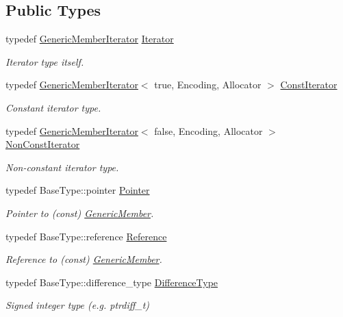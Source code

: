 \subsection*{Public Types}
\begin{DoxyCompactItemize}
\item 
typedef \hyperlink{classGenericMemberIterator}{Generic\+Member\+Iterator} \hyperlink{classGenericMemberIterator_ad1cf1ecf6210b47906c9f179c893a8b8}{Iterator}
\begin{DoxyCompactList}\small\item\em Iterator type itself. \end{DoxyCompactList}\item 
typedef \hyperlink{classGenericMemberIterator}{Generic\+Member\+Iterator}$<$ true, Encoding, Allocator $>$ \hyperlink{classGenericMemberIterator_ae5be27a73dce0be58ee2776db896d591}{Const\+Iterator}
\begin{DoxyCompactList}\small\item\em Constant iterator type. \end{DoxyCompactList}\item 
typedef \hyperlink{classGenericMemberIterator}{Generic\+Member\+Iterator}$<$ false, Encoding, Allocator $>$ \hyperlink{classGenericMemberIterator_abc26eb06f2962765b11dcd06ce84ac02}{Non\+Const\+Iterator}
\begin{DoxyCompactList}\small\item\em Non-\/constant iterator type. \end{DoxyCompactList}\item 
typedef Base\+Type\+::pointer \hyperlink{classGenericMemberIterator_ac69f141f1fde31c1f550f524a69c5de9}{Pointer}
\begin{DoxyCompactList}\small\item\em Pointer to (const) \hyperlink{structGenericMember}{Generic\+Member}. \end{DoxyCompactList}\item 
typedef Base\+Type\+::reference \hyperlink{classGenericMemberIterator_ae80f6b601eb9e24f73aa75fb32b35c65}{Reference}
\begin{DoxyCompactList}\small\item\em Reference to (const) \hyperlink{structGenericMember}{Generic\+Member}. \end{DoxyCompactList}\item 
typedef Base\+Type\+::difference\+\_\+type \hyperlink{classGenericMemberIterator_a902b99c8ae351cd7626514dc5f30740a}{Difference\+Type}
\begin{DoxyCompactList}\small\item\em Signed integer type (e.\+g. {\ttfamily ptrdiff\+\_\+t}) \end{DoxyCompactList}\end{DoxyCompactItemize}
